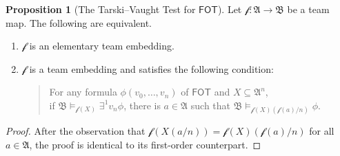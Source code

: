 \documentclass[a4paper]{amsart}
\theoremstyle{definition}
\newtheorem{proposition}[definition]{Proposition}
\theoremstyle{remark}
\newcommand{\A}{\mathcal{A}}
\newcommand{\B}{\mathcal{B}}
\newcommand{\existsone}{\exists^1}
\newcommand\fot{\mathsf{FOT}}
\theoremstyle{definition}
\renewcommand{\A}{\mathfrak{A}}
\renewcommand{\B}{\mathfrak{B}}
\newcommand{\f}{\mathcal{f}}
\begin{document}
\begin{proposition}[The Tarski--Vaught Test for $\fot$]\label{Tarski--Vaught of FOT}
    Let $\f\colon\A\to\B$ be a team map. The following are equivalent.
    \begin{enumerate}
        \item\label{Tarski-Vaught: elementary embedding}
        $\f$ is an elementary team embedding.

        \item\label{Tarski-Vaught: T-V condition}
        $\f$ is a team embedding and satisfies the following condition:
        \begin{quote}
            For any formula $\phi(v_0,\dots,v_n)$ of $\fot$ and $X\subseteq\A^n$, \\ if $\B\models_{\f(X)}\existsone v_n\phi$, there is $a\in\A$ such that $\B\models_{\f(X)(\f(a)/n)}\phi$.
        \end{quote}
    \end{enumerate}
\end{proposition}
\begin{proof}
    After the observation that $\f(X(a/n)) = \f(X)(\f(a)/n)$ for all $a\in\A$, the proof is identical to its first-order counterpart.
\end{proof}
\end{document}
